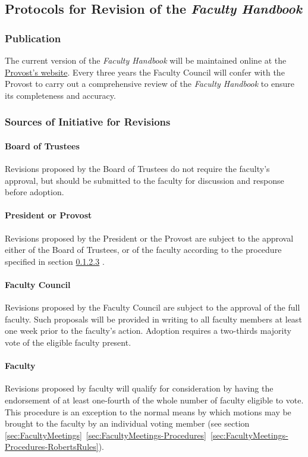 	\subsection{Protocols for Revision of the \emph{Faculty Handbook}}
		\label{sec:ProtocolsForRevision}
		\subsubsection{Publication}
			\label{sec:ProtocolsForRevision-Publication}
			The current version of the \emph{Faculty Handbook} will be maintained online at the \href{http://www.westmont.edu/_offices/provost/documents/Faculty-Handbook.pdf}{Provost's website}.  Every three years the Faculty Council will confer with the Provost to carry out a comprehensive review of the \emph{Faculty Handbook} to ensure its completeness and accuracy.
		\subsubsection{Sources of Initiative for Revisions}
			\label{sec:ProtocolsForRevision-Sources}
			\paragraph{Board of Trustees}
				Revisions proposed by the Board of Trustees do not require the faculty's approval, but should be submitted to the faculty for discussion and response before adoption.
			\paragraph{President or Provost}
				Revisions proposed by the President or the Provost are subject to the approval either of the Board of Trustees, or of the faculty according to the procedure specified in
				section
				\ref{sec:ProtocolsForRevision-Sources-FacultyCouncil}
				.

			\paragraph{Faculty Council}
				\label{sec:ProtocolsForRevision-Sources-FacultyCouncil}
				Revisions proposed by the Faculty Council are subject to the approval of the full faculty. Such proposals will be provided in writing to all faculty members at least one week prior to the faculty's action. Adoption requires a two-thirds majority vote of the eligible faculty present.
			\paragraph{Faculty}
				Revisions proposed by faculty will qualify for consideration by having the endorsement of at least one-fourth of the whole number of faculty eligible to vote. This procedure is an exception to the normal means by which motions may be brought to the faculty by an individual voting member (see
				section
				\ref{sec:FacultyMeetings}~\ref{sec:FacultyMeetings-Procedures}~\ref{sec:FacultyMeetings-Procedures-RobertsRules}).

